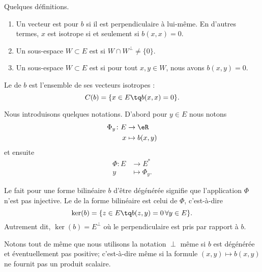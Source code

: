 \begin{definition}   \label{DefVKMnUEM}
	Quelques définitions.
	\begin{enumerate}
		\item
		      Un vecteur est  pour \( b\) si il est perpendiculaire à lui-même. En d'autres termes, \( x\) est isotrope si et seulement si \( b(x,x)=0\).
		\item
		      Un sous-espace \( W\subset E\) est  si \( W\cap W^{\perp}\neq \{ 0 \}\).
		\item

		      Un sous-espace \( W\subset E\) est  si pour tout \( x,y\in W\), nous avons \( b(x,y)=0\).
	\end{enumerate}

	Le  de \( b\) est l'ensemble de ses vecteurs isotropes :
	\begin{equation}
		C(b)=\{ x\in E\tq b(x,x)=0 \}.
	\end{equation}
\end{definition}
Nous introduisons quelques notations. D'abord pour \( y\in E\) nous notons
\begin{equation}
	\begin{aligned}
		\Phi_y\colon E & \to \eR        \\
		x              & \mapsto b(x,y)
	\end{aligned}
\end{equation}
et ensuite
\begin{equation}
	\begin{aligned}
		\Phi\colon E & \to E^*         \\
		y            & \mapsto \Phi_y.
	\end{aligned}
\end{equation}

\begin{definition}		\label{DEFooHKQVooPuWZiP}
	Le fait pour une forme bilinéaire \( b\) d'être dégénérée signifie que l'application \( \Phi\) n'est pas injective. Le  de la forme bilinéaire est celui de \( \Phi\), c'est-à-dire
	\begin{equation}
		\ker(b)=\{ z\in E\tq b(z,y)=0\,\forall y\in E \}.
	\end{equation}
	Autrement dit, \( \ker(b)=E^{\perp}\) où le perpendiculaire est pris par rapport à \( b\).
\end{definition}
Notons tout de même que nous utilisons la notation \( \perp\) même si \( b\) est dégénérée et éventuellement pas positive; c'est-à-dire même si la formule \( (x,y)\mapsto b(x,y)\) ne fournit pas un produit scalaire.


